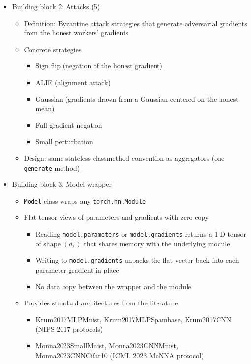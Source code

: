 \documentclass[twoside,11pt]{article}
\begin{document}
{\begin{itemize}
\begin{itemize}
    \end{itemize}
    \item Building block 2: Attacks (5)
    \begin{itemize}
        \item Definition: Byzantine attack strategies that generate adversarial gradients from the honest workers' gradients
        \item Concrete strategies
        \begin{itemize}
            \item Sign flip (negation of the honest gradient)
            \item ALIE (alignment attack)
            \item Gaussian (gradients drawn from a Gaussian centered on the honest mean)
            \item Full gradient negation
            \item Small perturbation
        \end{itemize}
        \item Design: same stateless classmethod convention as aggregators (one \texttt{generate} method)
    \end{itemize}
    \item Building block 3: Model wrapper
    \begin{itemize}
        \item \texttt{Model} class wraps any \texttt{torch.nn.Module}
        \item Flat tensor views of parameters and gradients with zero copy
        \begin{itemize}
            \item Reading \texttt{model.parameters} or \texttt{model.gradients} returns a 1-D tensor of shape $(d,)$ that shares memory with the underlying module
            \item Writing to \texttt{model.gradients} unpacks the flat vector back into each parameter gradient in place
            \item No data copy between the wrapper and the module
        \end{itemize}
        \item Provides standard architectures from the literature
        \begin{itemize}
            \item Krum2017MLPMnist, Krum2017MLPSpambase, Krum2017CNN (NIPS 2017 protocols)
            \item Monna2023SmallMnist, Monna2023CNNMnist, Monna2023CNNCifar10 (ICML 2023 MoNNA protocol)

\end{itemize}
\end{itemize}
\end{itemize}}
\end{document}
